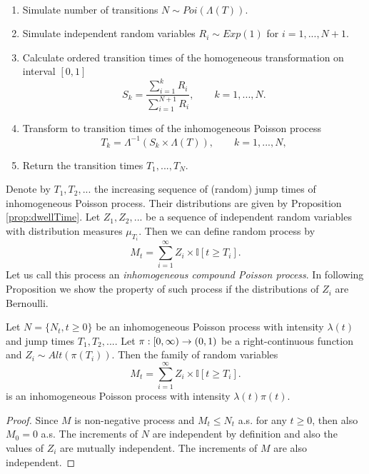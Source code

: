 {\begin{algorithm}\
	\label{algo:simulPoisson}
	\begin{enumerate}
		\item Simulate number of transitions $N \sim Poi (\Lambda(T))$.
		\item Simulate independent random variables $R_i \sim Exp(1)$ for $i = 1, ..., N+1$.
		\item Calculate ordered transition times of the homogeneous transformation on interval $[0,1]$
			\[
				S_k = \frac{\sum_{i=1}^{k} R_i}{\sum_{i=1}^{N+1} R_i}, \qquad k = 1, ..., N.
			\]
		\item Transform to transition times of the inhomogeneous Poisson process
			\[
				T_k = \Lambda^{-1} (S_k \times \Lambda(T)), \qquad k = 1, ..., N,
			\]
		\item Return the transition times $T_1, ..., T_N$.
	\end{enumerate}
\end{algorithm}



Denote by $T_1, T_2, ...$ the increasing sequence of (random) jump times of inhomogeneous Poisson process. Their distributions are given by Proposition \ref{prop:dwellTime}. Let $Z_1, Z_2, ...$ be a sequence of independent random variables with distribution measures $\mu_{T_i}$. Then we can define random process by
\[
	M_t = \sum_{i=1}^{\infty} Z_i \times \mathbb{I} [t \geq T_i].
\]
Let us call this process an \emph{inhomogeneous compound Poisson process}. In following Proposition we show the property of such process if the distributions of $Z_i$ are Bernoulli.

\begin{proposition}
	\label{prop:compoundPoisson}
	Let $N = \{N_t, t \geq 0\}$ be an inhomogeneous Poisson process with intensity $\lambda(t)$ and jump times $T_1, T_2, ...$. Let $\pi: [0, \infty) \to (0,1)$ be a right-continuous function and $Z_i \sim Alt(\pi(T_i))$. Then the family of random variables
	\[
		M_t = \sum_{i=1}^{\infty} Z_i \times \mathbb{I} [t \geq T_i].
	\]
	is an inhomogeneous Poisson process with intensity $\lambda(t) \pi(t)$.
\end{proposition}

\begin{proof}
	Since $M$ is non-negative process and $M_t \leq N_t$ a.s. for any $t \geq 0$, then also $M_0 = 0$ a.s. The increments of $N$ are independent by definition and also the values of $Z_i$ are mutually independent. The increments of $M$ are also independent.
	

\end{proof}}
